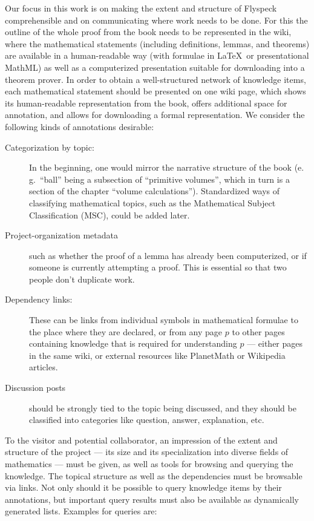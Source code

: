 Our focus in this work is on making the extent and structure of
Flyspeck comprehensible and on communicating where work needs to be
done.  For this the outline of the whole proof from the
book\cite{Hales:2007:FlyspeckBook} needs to be represented in the
wiki, where the mathematical statements (including definitions,
lemmas, and theorems) are available in a human-readable way (with
formulae in \LaTeX\ or presentational MathML) as well as a
computerized presentation suitable for downloading into a theorem
prover.  In order to obtain a well-structured network of knowledge
items, each mathematical statement should be presented on one wiki
page, which shows its human-readable representation from the book,
offers additional space for annotation, and allows for downloading a
formal representation.  We consider the following kinds of annotations
desirable:

\begin{description}
\item[Categorization by topic:] In the beginning, one would mirror the narrative structure
  of the book (e.\,g.\ ``ball'' being a subsection of ``primitive volumes'', which in turn
  is a section of the chapter ``volume calculations'').  Standardized ways of classifying
  mathematical topics, such as the Mathematical Subject Classification
  (MSC)\cite{AMS:MSC2000}, could be added later.
\item[Project-organization metadata] such as whether the proof
  of a lemma has already been computerized, or if someone is currently 
  attempting a proof.  This is essential so that two people don't duplicate
  work.
\item[Dependency links:] These can be links from individual symbols in mathematical
  formulae to the place where they are declared, or from any page $p$ to other pages
  containing knowledge that is required for understanding $p$ --- either pages in the same
  wiki, or external resources like PlanetMath or Wikipedia articles.
\item[Discussion posts] should be strongly tied to the topic being discussed, and they
  should be classified into categories like question, answer, explanation,
  etc.
\end{description}

To the visitor and potential collaborator, an impression of the extent and structure of
the project --- its size and its specialization into diverse fields of
mathematics --- must be given, as well as tools for browsing and querying the knowledge.
The topical structure as well as the dependencies must be browsable via links.  Not only
should it be possible to query knowledge items by their annotations, but important query
results must also be available as dynamically generated lists.  Examples for queries are:

